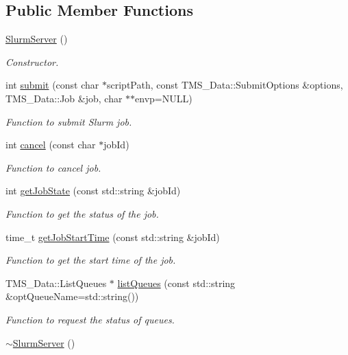 \subsection*{Public Member Functions}
\begin{DoxyCompactItemize}
\item 
\hypertarget{classSlurmServer_a451ef6b48bbd0a0335a2f82790f42988}{
\hyperlink{classSlurmServer_a451ef6b48bbd0a0335a2f82790f42988}{SlurmServer} ()}
\label{classSlurmServer_a451ef6b48bbd0a0335a2f82790f42988}

\begin{DoxyCompactList}\small\item\em Constructor. \item\end{DoxyCompactList}\item 
int \hyperlink{classSlurmServer_a351897c7bb3d2b1810cb6ea0bee6262b}{submit} (const char $\ast$scriptPath, const TMS\_\-Data::SubmitOptions \&options, TMS\_\-Data::Job \&job, char $\ast$$\ast$envp=NULL)
\begin{DoxyCompactList}\small\item\em Function to submit Slurm job. \item\end{DoxyCompactList}\item 
int \hyperlink{classSlurmServer_a5965b0689881cee596641c47135357e7}{cancel} (const char $\ast$jobId)
\begin{DoxyCompactList}\small\item\em Function to cancel job. \item\end{DoxyCompactList}\item 
int \hyperlink{classSlurmServer_ac0466b9e8159a2b3e963ab274c00da1d}{getJobState} (const std::string \&jobId)
\begin{DoxyCompactList}\small\item\em Function to get the status of the job. \item\end{DoxyCompactList}\item 
time\_\-t \hyperlink{classSlurmServer_a85aab0d27ed279c3696a033ddf1a05bf}{getJobStartTime} (const std::string \&jobId)
\begin{DoxyCompactList}\small\item\em Function to get the start time of the job. \item\end{DoxyCompactList}\item 
TMS\_\-Data::ListQueues $\ast$ \hyperlink{classSlurmServer_a363bf0b22c519039244f6bc938577e9c}{listQueues} (const std::string \&optQueueName=std::string())
\begin{DoxyCompactList}\small\item\em Function to request the status of queues. \item\end{DoxyCompactList}\item 
\hypertarget{classSlurmServer_aa7ff9a60deb4bca42bb39d0c5d98daa3}{
\hyperlink{classSlurmServer_aa7ff9a60deb4bca42bb39d0c5d98daa3}{$\sim$SlurmServer} ()}
\label{classSlurmServer_aa7ff9a60deb4bca42bb39d0c5d98daa3}


\end{DoxyCompactItemize}
